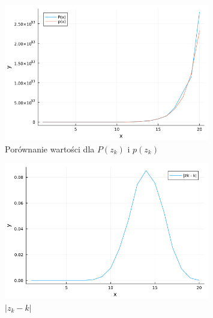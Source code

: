 \documentclass{article}
\begin{document}
\begin{figure}[H]
  \centering
  \includegraphics[width=0.8\textwidth]{../images/abs_P_vs_p.png}
  \caption{Porównanie wartości dla $P(z_k)$ i $p(z_k)$}
\end{figure}
\begin{figure}[H]
  \centering
  \includegraphics[width=0.8\textwidth]{../images/abs_P_roots_vs_i.png}
  \caption{$|z_k - k|$}
\end{figure}
\clearpage
\end{document}
